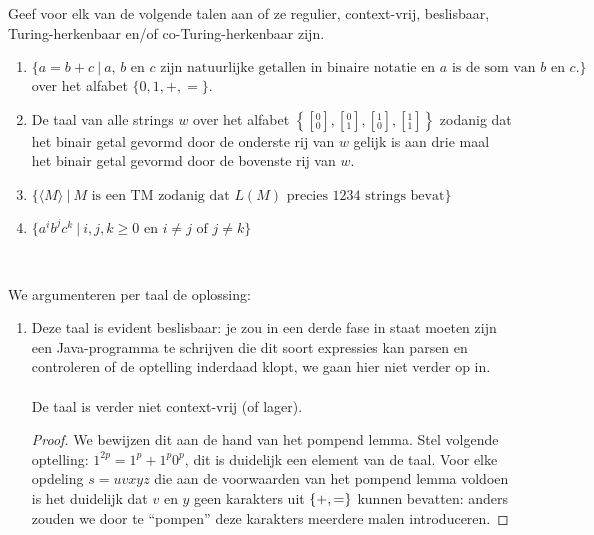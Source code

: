 \documentclass[a4paper]{article}
\newcommand{\twar}[2]{\left[ { }^{#1}_{#2} \right] }
\begin{document}
\begin{question}
Geef voor elk van de volgende talen aan of ze regulier, context-vrij, beslisbaar, Turing-herkenbaar en/of co-Turing-herkenbaar zijn.
\begin{enumerate}
  \item $\{ a = b+c \  | \ \text{$a$, $b$ en $c$ zijn natuurlijke getallen in binaire notatie en $a$ is de som van $b$ en $c$.} \}$ over het alfabet $\{0,1,+,=\}$.
  \item De taal van alle strings $w$ over het alfabet $\left\{ \twar{0}{0}, \twar{0}{1}, \twar{1}{0}, \twar{1}{1} \right\}$ zodanig dat het binair getal gevormd door de onderste rij van $w$ gelijk is aan drie maal het binair getal gevormd door de bovenste rij van $w$. 
  \item $\{ \langle M \rangle \ | \ \text{$M$ is een TM zodanig dat $L(M)$ precies 1234 strings bevat} \}$ %
  \item $\{ a^ib^jc^k \ | \ \text{$i,j,k \geq 0$ en $i \neq j$ of $j \neq k$} \}$ 
\end{enumerate}
\begin{answer}~~
\end{answer}
We argumenteren per taal de oplossing:
\begin{enumerate}
 \item Deze taal is evident beslisbaar: je zou in een derde fase in staat moeten zijn een Java-programma te schrijven die dit soort expressies kan parsen en controleren of de optelling inderdaad klopt, we gaan hier niet verder op in.
 \paragraph{}De taal is verder niet context-vrij (of lager).
 \begin{proof}
  We bewijzen dit aan de hand van het pompend lemma. Stel volgende optelling: $1^{2p}=1^p+1^p0^p$, dit is duidelijk een element van de taal. Voor elke opdeling $s=uvxyz$ die aan de voorwaarden van het pompend lemma voldoen is het duidelijk dat $v$ en $y$ geen karakters uit $\left\{ +,= \right\}$ kunnen bevatten: anders zouden we door te ``pompen'' deze karakters meerdere malen introduceren.

\end{proof}
\end{enumerate}
\end{question}
\end{document}

